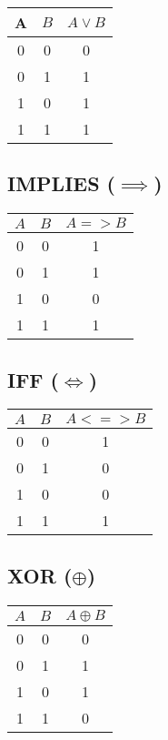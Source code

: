 \begin{multicols}{2}
	\begin{tabular}{ccc}
		\toprule
		\(\)A\(\) & \(B\) & \(A \lor B\) \\
		\midrule
		0   & 0   & 0          \\
		0   & 1   & 1          \\
		1   & 0   & 1          \\
		1   & 1   & 1          \\
		\bottomrule
	\end{tabular}

	\vspace{1em}

	\subsection*{IMPLIES (\(\implies\))}

	\begin{tabular}{ccc}
		\toprule
		\(A\) & \(B\) & \(A => B\) \\
		\midrule
		0   & 0   & 1        \\
		0   & 1   & 1        \\
		1   & 0   & 0        \\
		1   & 1   & 1        \\
		\bottomrule
	\end{tabular}

	\columnbreak

	\subsection*{IFF (\(\iff\))}

	\begin{tabular}{ccc}
		\toprule
		\(A\) & \(B\) & \(A <=> B\) \\
		\midrule
		0   & 0   & 1         \\
		0   & 1   & 0         \\
		1   & 0   & 0         \\
		1   & 1   & 1         \\
		\bottomrule
	\end{tabular}

	\vspace{1em}

	\subsection*{XOR (\(\oplus\))}

	\begin{tabular}{ccc}
		\toprule
		\(A\) & $B$ & $A \oplus B$ \\
		\midrule
		0   & 0   & 0            \\
		0   & 1   & 1            \\
		1   & 0   & 1            \\
		1   & 1   & 0            \\
		\bottomrule
	\end{tabular}


\end{multicols}
